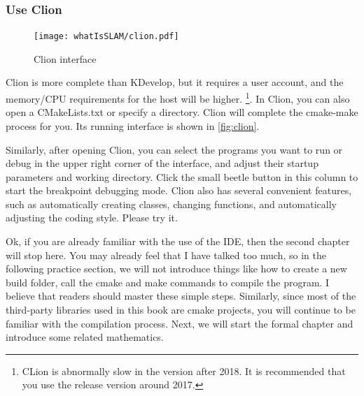 \subsubsection{Use Clion}
\begin{figure}[!t]
    \centering
    \texttt{[image: whatIsSLAM/clion.pdf]}
    \caption{Clion interface}
    \label{fig:clion}
\end{figure}

Clion is more complete than KDevelop, but it requires a user account, and the memory/CPU requirements for the host will be higher. \footnote{CLion is abnormally slow in the version after 2018. It is recommended that you use the release version around 2017. }. In Clion, you can also open a CMakeLists.txt or specify a directory. Clion will complete the cmake-make process for you. Its running interface is shown in \autoref{fig:clion}.

Similarly, after opening Clion, you can select the programs you want to run or debug in the upper right corner of the interface, and adjust their startup parameters and working directory. Click the small beetle button in this column to start the breakpoint debugging mode. Clion also has several convenient features, such as automatically creating classes, changing functions, and automatically adjusting the coding style. Please try it.

Ok, if you are already familiar with the use of the IDE, then the second chapter will stop here. You may already feel that I have talked too much, so in the following practice section, we will not introduce things like how to create a new build folder, call the cmake and make commands to compile the program. I believe that readers should master these simple steps. Similarly, since most of the third-party libraries used in this book are cmake projects, you will continue to be familiar with the compilation process. Next, we will start the formal chapter and introduce some related mathematics.

